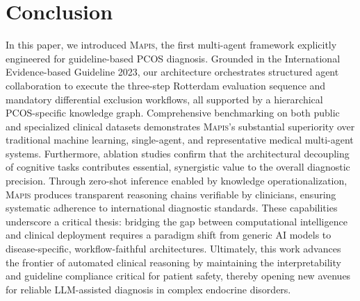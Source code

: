 \documentclass[a4paper,fleqn]{cas-dc}
\begin{document}
\section{Conclusion}
In this paper, we introduced \textsc{Mapis}, the first multi-agent framework explicitly engineered for guideline-based PCOS diagnosis. Grounded in the International Evidence-based Guideline 2023, our architecture orchestrates structured agent collaboration to execute the three-step Rotterdam evaluation sequence and mandatory differential exclusion workflows, all supported by a hierarchical PCOS-specific knowledge graph. Comprehensive benchmarking on both public and specialized clinical datasets demonstrates \textsc{Mapis}'s substantial superiority over traditional machine learning, single-agent, and representative medical multi-agent systems. Furthermore, ablation studies confirm that the architectural decoupling of cognitive tasks contributes essential, synergistic value to the overall diagnostic precision. Through zero-shot inference enabled by knowledge operationalization, \textsc{Mapis} produces transparent reasoning chains verifiable by clinicians, ensuring systematic adherence to international diagnostic standards. These capabilities underscore a critical thesis: bridging the gap between computational intelligence and clinical deployment requires a paradigm shift from generic AI models to disease-specific, workflow-faithful architectures. Ultimately, this work advances the frontier of automated clinical reasoning by maintaining the interpretability and guideline compliance critical for patient safety, thereby opening new avenues for reliable LLM-assisted diagnosis in complex endocrine disorders.


%





\end{document}
